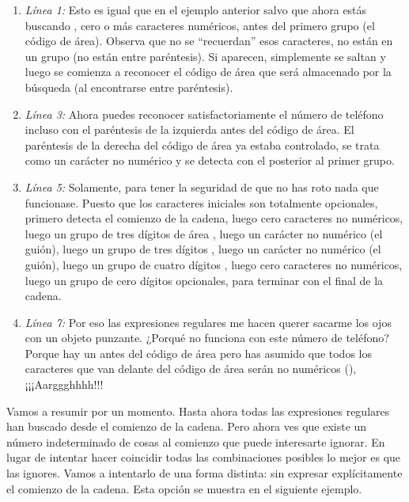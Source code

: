\begin{enumerate}

\item \emph{Línea 1:} Esto es igual que en el ejemplo anterior salvo que ahora estás buscando , cero o más caracteres numéricos, antes del primero grupo (el código de área). Observa que no se ``recuerdan'' esos caracteres, no están en un grupo (no están entre paréntesis). Si aparecen, simplemente se saltan y luego se comienza a reconocer el código de área que será almacenado por la búsqueda (al encontrarse entre paréntesis). 

\item \emph{Línea 3:} Ahora puedes reconocer satisfactoriamente el número de teléfono incluso con el paréntesis de la izquierda antes del código de área. El paréntesis de la derecha del código de área ya estaba controlado, se trata como un carácter no numérico y se detecta con el  posterior al primer grupo.

\item \emph{Línea 5:} Solamente, para tener la seguridad de que no has roto nada que funcionase. Puesto que los caracteres iniciales son totalmente opcionales, primero detecta el comienzo de la cadena, luego cero caracteres no numéricos, luego un grupo de tres dígitos de área , luego un carácter no numérico (el guión), luego un grupo de tres dígitos , luego un carácter no numérico (el guión), luego un grupo de cuatro dígitos , luego cero caracteres no numéricos, luego un grupo de cero dígitos opcionales, para terminar con el final de la cadena.

\item \emph{Línea 7:} Por eso las expresiones regulares me hacen querer sacarme los ojos con un objeto punzante. ¿Porqué no funciona con este número de teléfono? Porque hay un  antes del código de área pero has asumido que todos los caracteres que van delante del código de área serán no numéricos (), ¡¡¡Aarggghhhh!!!

\end{enumerate}

Vamos a resumir por un momento. Hasta ahora todas las expresiones regulares han buscado desde el comienzo de la cadena. Pero ahora ves que existe un número indeterminado de cosas al comienzo que puede interesarte ignorar. En lugar de intentar hacer coincidir todas las combinaciones posibles lo mejor es que las ignores. Vamos a intentarlo de una forma distinta: sin expresar explícitamente el comienzo de la cadena. Esta opción se muestra en el siguiente ejemplo.


